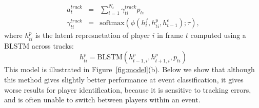 \begin{eqnarray} 
\label{eq:track}
  a_t^{track} & = & \sum_{i=1}^{N_t} \gamma_{ti}^{track} p_{ti} 
\\ \nonumber
  \gamma_{ti}^{track} & = & \text{softmax} \left(\phi\left(h^f_t, h^p_{ti}, h^e_{t-1}\right); \tau\right),
\end{eqnarray}
where $h_{ti}^p$ is the latent represnetation of player $i$ in frame
$t$ computed using a BLSTM across tracks:
\[
  h_{ti}^p = \mbox{BLSTM}(h_{t-1,i}^p, h_{t+1,i}^p, p_{ti})
\]
This model is illustrated in Figure~\ref{fig:model}(b).
Below  we show that although this method gives slightly better
performance at event classification, it gives worse results for player
identification, because it is sensitive to tracking errors, and
is often unable to switch between players within an event.
